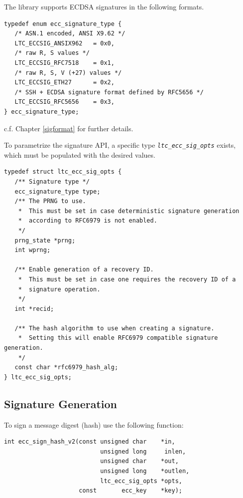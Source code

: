 \documentclass[synpaper]{book}
\newcommand{\code}[1]{\texttt{\textit{#1}}}
\begin{document}
The library supports ECDSA signatures in the following formats.

\begin{small}
\begin{verbatim}
typedef enum ecc_signature_type {
   /* ASN.1 encoded, ANSI X9.62 */
   LTC_ECCSIG_ANSIX962   = 0x0,
   /* raw R, S values */
   LTC_ECCSIG_RFC7518    = 0x1,
   /* raw R, S, V (+27) values */
   LTC_ECCSIG_ETH27      = 0x2,
   /* SSH + ECDSA signature format defined by RFC5656 */
   LTC_ECCSIG_RFC5656    = 0x3,
} ecc_signature_type;
\end{verbatim}
\end{small}

c.f. Chapter \ref{sigformat} for further details.

To parametrize the signature API, a specific type \code{ltc\_ecc\_sig\_opts} exists, which must be populated with the desired values.

\begin{small}
\begin{verbatim}
typedef struct ltc_ecc_sig_opts {
   /** Signature type */
   ecc_signature_type type;
   /** The PRNG to use.
    *  This must be set in case deterministic signature generation
    *  according to RFC6979 is not enabled.
    */
   prng_state *prng;
   int wprng;

   /** Enable generation of a recovery ID.
    *  This must be set in case one requires the recovery ID of a
    *  signature operation.
    */
   int *recid;

   /** The hash algorithm to use when creating a signature.
    *  Setting this will enable RFC6979 compatible signature generation.
    */
   const char *rfc6979_hash_alg;
} ltc_ecc_sig_opts;
\end{verbatim}
\end{small}

\subsection{Signature Generation}
\label{ecc-sign}
To sign a message digest (hash) use the following function:

\begin{verbatim}
int ecc_sign_hash_v2(const unsigned char    *in,
                           unsigned long     inlen,
                           unsigned char    *out,
                           unsigned long    *outlen,
                           ltc_ecc_sig_opts *opts,
                     const       ecc_key    *key);
\end{verbatim}
\end{document}
